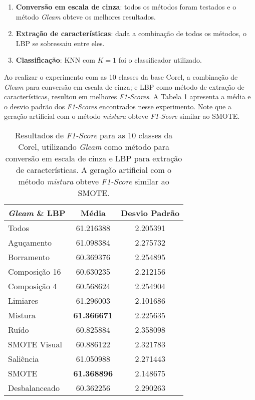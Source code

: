 \begin{enumerate}
\item \textbf{Conversão em escala de cinza}: todos os métodos foram testados e o método \textit{Gleam} obteve os melhores resultados.

\item \textbf{Extração de características}: dada a combinação de todos os métodos, o LBP se sobressaiu entre eles.

\item \textbf{Classificação}: KNN com $K=1$ foi o classificador utilizado.
\end{enumerate}


Ao realizar o experimento com as 10 classes da base Corel, a combinação de \emph{Gleam} para conversão em escala de cinza; e LBP como método de extração de características, resultou em melhores \textit{F1-Scores}. A Tabela \ref{tab:resultados:3.1} apresenta a média e o desvio padrão dos \textit{F1-Scores} encontrados nesse experimento. Note que a geração artificial com o método \emph{mistura} obteve \textit{F1-Score} similar ao SMOTE.

\begin{table}[!htbp]
\begin{center}
\caption{Resultados de \textit{F1-Score} para as 10 classes da Corel, utilizando \emph{Gleam} como método para conversão em escala de cinza e LBP para extração de características. A geração artificial com o método \emph{mistura} obteve \textit{F1-Score} similar ao SMOTE.}
\label{tab:resultados:3.1}
\begin{tabular}{|l|c|c|}
\hline
\textbf{\emph{Gleam} \& LBP} & \textbf{Média}     & \textbf{Desvio Padrão} \\ \hline
   Todos        &  61.216388 &  2.205391  \\ \hline
  Aguçamento    &  61.098384 &  2.275732  \\ \hline
  Borramento    &  60.369376 &  2.254895  \\ \hline
  Composição 16 &  60.630235 &  2.212156  \\ \hline
  Composição 4  &  60.568624 &  2.254904  \\ \hline
  Limiares      &  61.296003 &  2.101686  \\ \hline
  Mistura       &  \textbf{61.366671} &  2.225635  \\ \hline
  Ruído         &  60.825884 &  2.358098  \\ \hline
  SMOTE Visual  &  60.886122 &  2.321783  \\ \hline
  Saliência     &  61.050988 &  2.271443  \\ \hline
 SMOTE          &  \textbf{61.368896} &  2.148675  \\ \hline
Desbalanceado   &  60.362256 &  2.290263  \\ \hline
\end{tabular}
\end{center}
\end{table}

